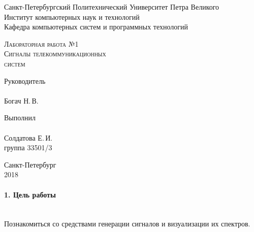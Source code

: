 \documentclass[12pt,a4paper]{report}
\begin{document}
\begin{titlepage}
\newpage
  \begin{center}
     
    Санкт-Петербургский Политехнический Университет Петра Великого \\
    
    Институт компьютерных наук и технологий \\
    
    Кафедра компьютерных систем и программных технологий
    \end{center}
    
    \vspace{15em}
    \begin{center}
    \textsc{Лабораторная работа №1}\\
    \vspace{5mm}
    \textsc{Сигналы телекоммуникационных\\
      систем}
    
   \end{center}
\vspace{10em}

\newlength{\ML}
\hfill\begin{minipage}{0.45\textwidth}
\vfill
  Руководитель \\
  \\
  \underline{\hspace{\ML}} Богач Н.\,В.\\
 
\end{minipage}%
\bigskip

\hfill\begin{minipage}{0.45\textwidth}
  Выполнил\\
  \\
  \underline{\hspace{\ML}} Солдатова Е.\,И.\\
  группа 33501/3
\end{minipage}%

\vspace{\fill}
\begin{center}
    
  Санкт-Петербург\\
   2018 
\end{center}
\end{titlepage}

\paragraph{1. Цель работы\\\\}
Познакомиться со средствами генерации сигналов и визуализации их спектров.
\end{document}
